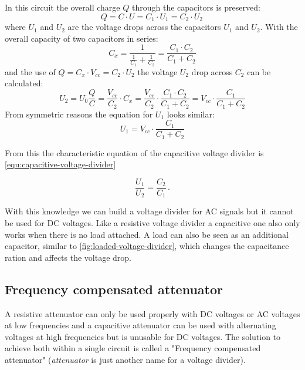 In this circuit the overall charge $Q$ through the capacitors is preserved:
\begin{equation*}
	Q = C \cdot U = C_1 \cdot U_1 = C_2 \cdot U_2\,
\end{equation*}
where $U_1$ and $U_2$ are the voltage drops across the capacitors $U_1$ and $U_2$. With the overall capacity of two capacitors in series:
\begin{equation*}
	C_x = \frac{1}{\frac{1}{C_1} + \frac{1}{C_2}} = \frac{C_1 \cdot C_2}{C_1 + C_2}
\end{equation*}
and the use of $Q = C_x \cdot V_{cc} = C_2 \cdot U_2$ the voltage $U_2$ drop across $C_2$ can be calculated:
\begin{equation*}
	U_2 = U_0 \frac{Q}{C} =  \frac{V_{cc}}{C_2} \cdot C_x = \frac{V_{cc}}{C_2} \cdot \frac{C_1 \cdot C_2}{C_1 + C_2} = V_{cc} \cdot \frac{C_1}{C_1 + C_2}
\end{equation*}
From symmetric reasons the equation for $U_1$ looks similar:
\begin{equation*}
	U_1 =  V_{cc} \cdot \frac{C_1}{C_1 + C_2}
\end{equation*}

From this the characteristic equation of the capacitive voltage divider is \cref{equ:capacitive-voltage-divider}

\begin{equation}
	\frac{U_1}{U_2} = \frac{C_2}{C_1}\,.
	\label{equ:capacitive-voltage-divider}
\end{equation}

With this knowledge we can build a voltage divider for AC signals but it cannot be used for DC voltages. Like a resistive voltage divider a capacitive one also only works when there is no load attached. A load can also be seen as an additional capacitor, similar to \cref{fig:loaded-voltage-divider}, which changes the capacitance ration and affects the voltage drop.


\subsection{Frequency compensated attenuator}

A resistive attenuator can only be used properly with DC voltages or AC voltages at low frequencies and a capacitive attenuator can be used with alternating voltages at high frequencies but is unusable for DC voltages. The solution to achieve both within a single circuit is called a "Frequency compensated attenuator" (\textit{attenuator} is just another name for a voltage divider).


